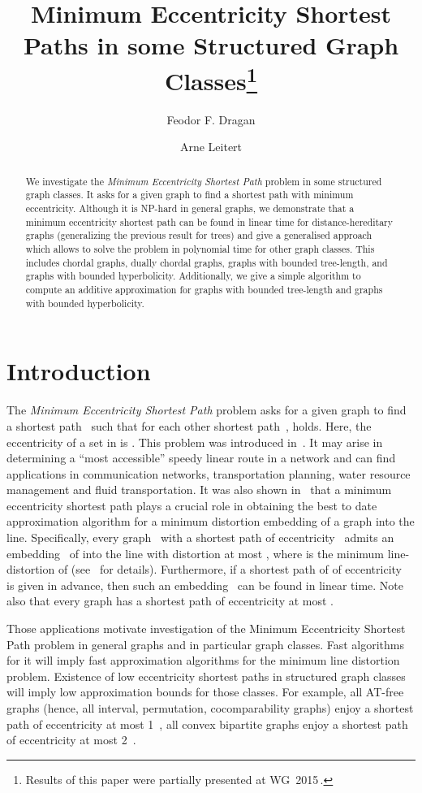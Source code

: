 \documentclass[10pt]{llncs}
\title
{Minimum Eccentricity Shortest Paths in some Structured Graph Classes\thanks
    {Results of this paper were partially presented at WG~2015\,\cite{DraganLeiter2015}.
    }
}
\author
{Feodor F. Dragan 
    \and 
    Arne Leitert
}
\institute{
    Department of Computer Science, \\
    Kent State University, Kent, Ohio, USA  \\
    \email{dragan@cs.kent.edu}, 
    \email{aleitert@cs.kent.edu} 
}
\begin{document}
\pagestyle{plain}
\maketitle

\begin{abstract}
We investigate the \emph{Minimum Eccentricity Shortest Path} problem in some structured graph classes. 
It asks for a given graph to find a shortest path with minimum eccentricity. 
Although it is NP-hard in general graphs, we demonstrate that a minimum eccentricity shortest path can be found in linear time for distance-hereditary graphs (generalizing the previous result for trees) and give a generalised approach which allows to solve the problem in polynomial time for other graph classes.
This includes chordal graphs, dually chordal graphs, graphs with bounded tree-length, and graphs with bounded hyperbolicity.
Additionally, we give a simple algorithm to compute an additive approximation for graphs with bounded tree-length and graphs with bounded hyperbolicity.
\end{abstract}

\section{Introduction}

The \emph{Minimum Eccentricity Shortest Path} problem asks for a given graph  to find a shortest path~ such that for each other shortest path~,  holds.
Here, the eccentricity of a set  in  is .
This problem was introduced in~\cite{DrLei2015}.
It may arise in determining a ``most accessible'' speedy linear route in a network  and can find applications in communication networks, transportation planning, water resource management and fluid transportation.
It was also shown in~\cite{DKL2014,DrLei2015} that a minimum eccentricity shortest path plays a crucial role in obtaining the best to date approximation algorithm for a minimum distortion embedding of a graph into the line.
Specifically, every graph~ with a shortest path of eccentricity~ admits an embedding~ of  into the line with distortion at most , where  is the minimum line-distortion of  (see~\cite{DrLei2015} for details).
Furthermore, if a shortest path of  of eccentricity~ is given in advance, then such an embedding~ can be found in linear time.
Note also that every graph has a shortest path of eccentricity at most .

Those applications motivate investigation of the Minimum Eccentricity Shortest Path problem  in general graphs and in particular graph classes.
Fast algorithms for it will imply fast approximation algorithms for the minimum line distortion problem.
Existence of low eccentricity shortest paths in structured graph classes will imply low approximation bounds for those classes.
For example, all AT-free graphs (hence, all interval, permutation, cocomparability graphs) enjoy a shortest path of eccentricity at most 1~\cite{COS-SICOMP}, all convex bipartite graphs enjoy a shortest path of eccentricity at most 2~\cite{DKL2014}.
\end{document}
